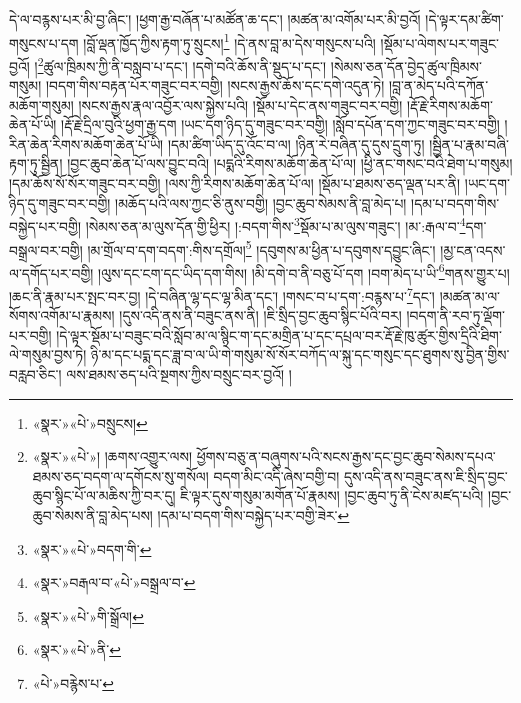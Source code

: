 དེ་ལ་བརྙས་པར་མི་བྱ་ཞིང་། །ཕྱག་རྒྱ་བཞོན་པ་མཚོན་ཆ་དང་། །མཚན་མ་འགོམ་པར་མི་བྱའོ། །དེ་ལྟར་དམ་ཚིག་གསུངས་པ་དག །བློ་ལྡན་ཁྱོད་ཀྱིས་རྟག་ཏུ་སྲུངས།\footnote{«སྣར་»«པེ་»བསྲུངས།} །དེ་ནས་བླ་མ་དེས་གསུངས་པའི། །སྡོམ་པ་ལེགས་པར་གཟུང་བྱའོ། །\footnote{«སྣར་»«པེ་»། །ཆགས་འགྱུར་ལས། ཕྱོགས་བཅུ་ན་བཞུགས་པའི་སངས་རྒྱས་དང་བྱང་ཆུབ་སེམས་དཔའ་ཐམས་ཅད་བདག་ལ་དགོངས་སུ་གསོལ། བདག་མིང་འདི་ཞེས་བགྱི་བ། དུས་འདི་ནས་བཟུང་ནས་ཇི་སྲིད་བྱང་ཆུབ་སྙིང་པོ་ལ་མཆིས་ཀྱི་བར་དུ། ཇི་ལྟར་དུས་གསུམ་མགོན་པོ་རྣམས། །བྱང་ཆུབ་ཏུ་ནི་ངེས་མཛད་པའི། །བྱང་ཆུབ་སེམས་ནི་བླ་མེད་པས། །དམ་པ་བདག་གིས་བསྐྱེད་པར་བགྱི་ཟེར་}ཚུལ་ཁྲིམས་ཀྱི་ནི་བསླབ་པ་དང་། །དགེ་བའི་ཆོས་ནི་སྡུད་པ་དང་། །སེམས་ཅན་དོན་བྱེད་ཚུལ་ཁྲིམས་གསུམ། །བདག་གིས་བརྟན་པོར་གཟུང་བར་བགྱི། །སངས་རྒྱས་ཆོས་དང་དགེ་འདུན་ཏེ། །བླ་ན་མེད་པའི་དཀོན་མཆོག་གསུམ། །སངས་རྒྱས་རྣལ་འབྱོར་ལས་སྐྱེས་པའི། །སྡོམ་པ་དེང་ནས་གཟུང་བར་བགྱི། །རྡོ་རྗེ་རིགས་མཆོག་ཆེན་པོ་ཡི། །རྡོ་རྗེ་དྲིལ་བུའི་ཕྱག་རྒྱ་དག །ཡང་དག་ཉིད་དུ་གཟུང་བར་བགྱི། །སློབ་དཔོན་དག་ཀྱང་གཟུང་བར་བགྱི། །རིན་ཆེན་རིགས་མཆོག་ཆེན་པོ་ཡི། །དམ་ཚིག་ཡིད་དུ་འོང་བ་ལ། །ཉིན་རེ་བཞིན་དུ་དུས་དྲུག་ཏུ། །སྦྱིན་པ་རྣམ་བཞི་རྟག་ཏུ་སྦྱིན། །བྱང་ཆུབ་ཆེན་པོ་ལས་བྱུང་བའི། །པདྨའི་རིགས་མཆོག་ཆེན་པོ་ལ། །ཕྱི་ནང་གསང་བའི་ཐེག་པ་གསུམ། །དམ་ཆོས་སོ་སོར་གཟུང་བར་བགྱི། །ལས་ཀྱི་རིགས་མཆོག་ཆེན་པོ་ལ། །སྡོམ་པ་ཐམས་ཅད་ལྡན་པར་ནི། །ཡང་དག་ཉིད་དུ་གཟུང་བར་བགྱི། །མཆོད་པའི་ལས་ཀྱང་ཅི་ནུས་བགྱི། །བྱང་ཆུབ་སེམས་ནི་བླ་མེད་པ། །དམ་པ་བདག་གིས་བསྐྱེད་པར་བགྱི། །སེམས་ཅན་མ་ལུས་དོན་གྱི་ཕྱིར། །:བདག་གིས་\footnote{«སྣར་»«པེ་»བདག་གི་}སྡོམ་པ་མ་ལུས་གཟུང་། །མ་:རྒལ་བ་\footnote{«སྣར་»བརྒལ་བ་«པེ་»བསྒྲལ་བ་}དག་བསྒྲལ་བར་བགྱི། །མ་གྲོལ་བ་དག་བདག་:གིས་དགྲོལ།\footnote{«སྣར་»«པེ་»གི་སྒྲོལ།} །དབུགས་མ་ཕྱིན་པ་དབུགས་དབྱུང་ཞིང་། །མྱ་ངན་འདས་ལ་དགོད་པར་བགྱི། །ལུས་དང་ངག་དང་ཡིད་དག་གིས། །མི་དགེ་བ་ནི་བཅུ་པོ་དག །བག་མེད་པ་ཡི་\footnote{«སྣར་»«པེ་»ནི་}གནས་གྱུར་པ། །ཆང་ནི་རྣམ་པར་སྤང་བར་བྱ། །དེ་བཞིན་ལྷ་དང་ལྷ་མིན་དང་། །གསང་བ་པ་དག་:བརྙས་པ་\footnote{«པེ་»བརྙེས་པ་}དང་། །མཚན་མ་ལ་སོགས་འགོམ་པ་རྣམས། །དུས་འདི་ནས་ནི་བཟུང་ནས་ནི། །ཇི་སྲིད་བྱང་ཆུབ་སྙིང་པོའི་བར། །བདག་ནི་རབ་ཏུ་ལྡོག་པར་བགྱི། །དེ་ལྟར་སྡོམ་པ་བཟུང་བའི་སློབ་མ་ལ་སྙིང་ག་དང་མགྲིན་པ་དང་དཔྲལ་བར་རྡོ་རྗེ་ཁུ་ཚུར་གྱིས་དྲིའི་ཐིག་ལེ་གསུམ་བྱས་ཏེ། ཉི་མ་དང་པདྨ་དང་ཟླ་བ་ལ་ཡི་གེ་གསུམ་སོ་སོར་བཀོད་ལ་སྐུ་དང་གསུང་དང་ཐུགས་སུ་བྱིན་གྱིས་བརླབ་ཅིང་། ལས་ཐམས་ཅད་པའི་སྔགས་ཀྱིས་བསྲུང་བར་བྱའོ། །
